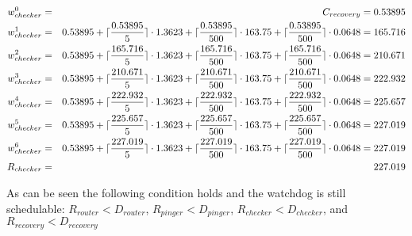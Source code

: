 \begin{eqnarray}
\label{eq:recovery}
    w_{checker}^0 &=& C_{recovery} = 0.53895 \nonumber \\ 
    w_{checker}^1 &=& 0.53895 + \lceil\frac{0.53895}{5}\rceil \cdot 1.3623 + \lceil\frac{0.53895}{500}\rceil \cdot 163.75 + \lceil\frac{0.53895}{500}\rceil \cdot 0.0648  = 165.716 \nonumber \\ 
    w_{checker}^2 &=& 0.53895 + \lceil\frac{165.716}{5}\rceil \cdot 1.3623 + \lceil\frac{165.716}{500}\rceil \cdot 163.75 + \lceil\frac{165.716}{500}\rceil \cdot 0.0648  = 210.671 \nonumber \\ 
    w_{checker}^3 &=& 0.53895 + \lceil\frac{210.671}{5}\rceil \cdot 1.3623 + \lceil\frac{210.671}{500}\rceil \cdot 163.75 + \lceil\frac{210.671}{500}\rceil \cdot 0.0648  = 222.932 \nonumber \\ 
    w_{checker}^4 &=& 0.53895 + \lceil\frac{222.932}{5}\rceil \cdot 1.3623 + \lceil\frac{222.932}{500}\rceil \cdot 163.75 + \lceil\frac{222.932}{500}\rceil \cdot 0.0648  = 225.657 \nonumber \\ 
    w_{checker}^5 &=& 0.53895 + \lceil\frac{225.657}{5}\rceil \cdot 1.3623 + \lceil\frac{225.657}{500}\rceil \cdot 163.75 + \lceil\frac{225.657}{500}\rceil \cdot 0.0648  = 227.019 \nonumber \\ 
    w_{checker}^6 &=& 0.53895 + \lceil\frac{227.019}{5}\rceil \cdot 1.3623 + \lceil\frac{227.019}{500}\rceil \cdot 163.75 + \lceil\frac{227.019}{500}\rceil \cdot 0.0648  = 227.019 \nonumber \\ 
    R_{checker} &=& 227.019
\end{eqnarray}

As can be seen the following condition holds and the watchdog is still schedulable:
$R_{router} < D_{router}$, $R_{pinger} < D_{pinger}$, $R_{checker} < D_{checker}$, and $R_{recovery} < D_{recovery}$

